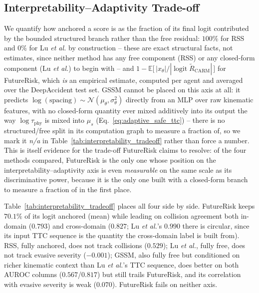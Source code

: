 \documentclass[letterpaper, 10 pt, conference]{ieeeconf}  %
\begin{document}
\subsection{Interpretability--Adaptivity Trade-off}
\label{sec:exp_tradeoff}

We quantify how anchored a score is as the fraction of its final logit
contributed by the bounded structured branch rather than the free
residual: $100\%$ for RSS and $0\%$ for Lu \emph{et al.} by construction
-- these are exact structural facts, not estimates, since neither method
has any free component (RSS) or any closed-form component (Lu \emph{et
al.}) to begin with -- and $1-\mathbb E\big[\,|x_\theta|/|\operatorname{logit}\widetilde
R_{\mathrm{CARM}}|\,\big]$ for FutureRisk, which \emph{is} an empirical
estimate, computed per agent and averaged over the DeepAccident test set.
GSSM cannot be placed on this axis at all: it predicts $\log(\text{spacing})
\sim \mathcal N(\mu_\theta, \sigma_\theta^2)$ directly from an MLP over raw
kinematic features, with no closed-form quantity ever mixed additively
into its output the way $\log\tau_{\mathrm{phy}}$ is mixed into
$\mu_s$ (Eq.~\eqref{eq:adaptive_safe_ttc}) -- there is no structured/free
split in its computation graph to measure a fraction of, so we mark it
\emph{n/a} in Table~\ref{tab:interpretability_tradeoff} rather than force
a number. This is itself evidence for the trade-off FutureRisk claims to
resolve: of the four methods compared, FutureRisk is the only one whose
position on the interpretability--adaptivity axis is even
\emph{measurable} on the same scale as its discriminative power, because
it is the only one built with a closed-form branch to measure a fraction
of in the first place.

Table~\ref{tab:interpretability_tradeoff} places all four side by side.
FutureRisk keeps $70.1\%$ of its logit anchored (mean) while leading on
collision agreement both in-domain ($0.793$) and cross-domain ($0.827$;
Lu \emph{et al.}'s $0.990$ there is circular, since its input TTC sequence
is the quantity the cross-domain label is built from). RSS, fully
anchored, does not track collisions ($0.529$); Lu \emph{et al.}, fully
free, does not track evasive severity ($-0.001$); GSSM, also fully free
but conditioned on richer kinematic context than Lu \emph{et al.}'s TTC
sequence, does better on both AUROC columns ($0.567$/$0.817$) but still
trails FutureRisk, and its correlation with evasive severity is weak
($0.070$). FutureRisk fails on neither axis.
\end{document}
